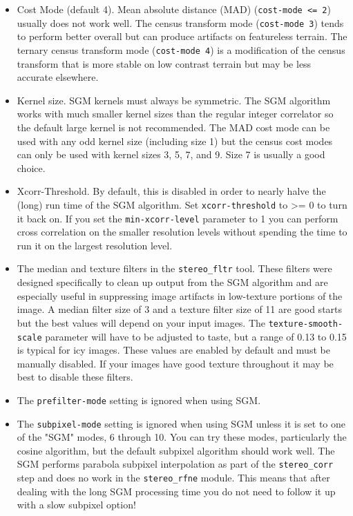 \begin{itemize}
\item Cost Mode (default 4).  Mean absolute distance (MAD) 
(\texttt{cost-mode <= 2}) usually does not work well.  
The census transform mode (\texttt{cost-mode 3}) \citep{zabih1994census} tends to 
perform better overall but can produce artifacts on featureless terrain.  
The ternary census transform mode (\texttt{cost-mode 4}) \citep{hua2016texture} 
is a modification of the census transform that is more stable on low contrast terrain
but may be less accurate elsewhere.
\item Kernel size.  SGM kernels must always be symmetric.
The SGM algorithm works with much smaller kernel sizes than the regular integer 
correlator so the default large kernel is not recommended.
The MAD cost mode can be used with any odd kernel size (including size 1) but the census 
cost modes can only be used with kernel sizes 3, 5, 7, and 9.  Size 7 is usually a good choice.
\item Xcorr-Threshold. By default, this is disabled in order to nearly halve the (long) run time of the SGM
algorithm.  Set \texttt{xcorr-threshold} to >= 0 to turn it back on.  If you set the
\texttt{min-xcorr-level} parameter to 1 you can perform cross correlation on the smaller resolution levels
without spending the time to run it on the largest resolution level.
\item The median and texture filters in the \texttt{stereo\_fltr} tool.  These filters
were designed specifically to clean up output from the SGM algorithm and are especially useful in suppressing
image artifacts in low-texture portions of the image.  A median filter size of 3 and a texture filter size of 11
are good starts but the best values will depend on your input images. The \texttt{texture-smooth-scale}
parameter will have to be adjusted to taste, but a range of 0.13 to 0.15 is typical for icy images.  These
values are enabled by default and must be manually disabled.  If your images have good texture throughout
it may be best to disable these filters.
\item The \texttt{prefilter-mode} setting is ignored when using SGM.
\item The \texttt{subpixel-mode} setting is ignored when using SGM unless it is set to
one of the "SGM" modes, 6 through 10.  You can try these modes, particularly the cosine algorithm,
but the default subpixel algorithm should work well.  The SGM performs parabola subpixel interpolation as part of
the \texttt{stereo\_corr} step and does no work in the \texttt{stereo\_rfne} module.  This means that
after dealing with the long SGM processing time you do not need to follow it up with a slow subpixel option!
\end{itemize}

